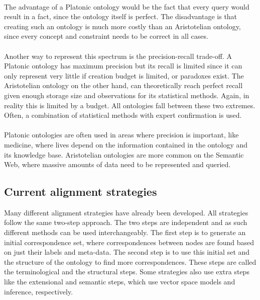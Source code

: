 \documentclass{article}
\begin{document}
 \paragraph{}
 The advantage of a Platonic ontology would be the fact that every query would result in a fact, since the ontology itself is perfect. The disadvantage is that creating such an ontology is much more costly than an Aristotelian ontology, since every concept and constraint needs to be correct in all cases.
 \paragraph{}
 Another way to represent this spectrum is the precision-recall trade-off. A Platonic ontology has maximum precision but its recall is limited since it can only represent very little if creation budget is limited, or paradoxes exist. The Aristotelian ontology on the other hand, can theoretically reach perfect recall given enough storage size and observations for its statistical methods. Again, in reality this is limited by a budget. All ontologies fall between these two extremes. Often, a combination of statistical methods with expert confirmation is used.
 \paragraph{}
 Platonic ontologies are often used in areas where precision is important, like medicine, where lives depend on the information contained in the ontology and its knowledge base. Aristotelian ontologies are more common on the Semantic Web, where massive amounts of data need to be represented and queried.
 
 \subsection{Current alignment strategies} \label{strategies}
 Many different alignment strategies have already been developed. All strategies follow the same two-step approach. The two steps are independent and as such different methods can be used interchangeably. The first step is to generate an initial correspondence set, where correspondences between nodes are found based on just their labels and meta-data. The second step is to use this initial set and the structure of the ontology to find more correspondences. These steps are called the terminological and the structural steps. Some strategies also use extra steps like the extensional and semantic steps, which use vector space models and inference, respectively\cite{future}.
\end{document}
